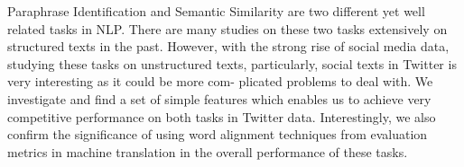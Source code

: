 Paraphrase Identification and Semantic Similarity are two different yet well related tasks in NLP. There are many studies on these two tasks extensively on structured texts in the past. However, with the strong rise of social media data, studying these tasks on unstructured texts, particularly, social texts in Twitter is very interesting as it could be more com- plicated problems to deal with. We investigate and find a set of simple features which enables us to achieve very competitive performance on both tasks in Twitter data. Interestingly, we also confirm the significance of using word alignment techniques from evaluation metrics in machine translation in the overall performance of these tasks.
